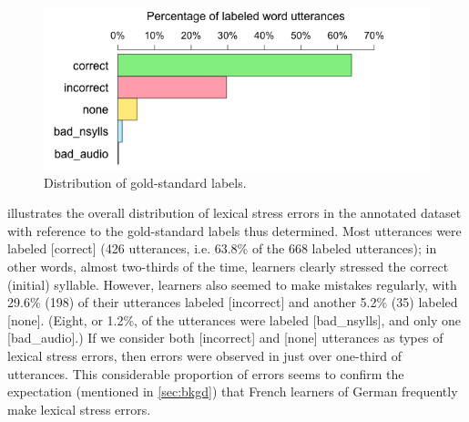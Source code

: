 \documentclass[a4paper]{article}
\newcommand{\TODO}[1]{{\color{red}\textbf{[TODO #1]}}}
\begin{document}
		\begin{figure}[!b]
			\centering
			\includegraphics[width=\columnwidth]{overallJudgments-axisTop-noLabels}
			\caption{
			Distribution of gold-standard labels.
			}
			\label{fig:errors}
		\end{figure}
			
		
		 illustrates
		the overall distribution of lexical stress errors in the annotated dataset 
		with reference to the gold-standard labels thus determined.
		Most 
		utterances were labeled [correct] 
		(426 utterances, i.e. 63.8\% of the 668 labeled utterances);
		in other words, almost two-thirds of the time, learners clearly stressed the correct (initial) syllable. %
		However, learners also seemed to make mistakes regularly, with 29.6\% (198) of their utterances labeled [incorrect] and another 5.2\% (35) labeled [none].
		(Eight, or 1.2\%, of the utterances were labeled [bad\_nsylls], and only one [bad\_audio].)
		If we consider both [incorrect] and [none] utterances as types of lexical stress errors, then errors were observed in just over one-third of utterances. %
		This considerable proportion of errors seems to confirm the expectation (mentioned in \cref{sec:bkgd}) that French learners of German frequently make lexical stress errors.
		
\end{document}
